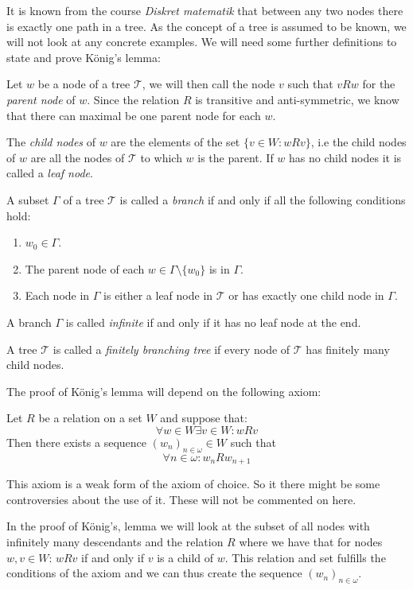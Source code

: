 \documentclass[../main.tex]{subfiles}
\begin{document}
It is known from the course \textit{Diskret matematik} that between any two
nodes there is exactly one path in a tree. 
As the concept of a tree is assumed to be known, we will not look at any concrete
examples.
We will need
some further definitions to state and prove König's lemma:
\begin{defi}
	Let $w$ be a node of a tree $\mathcal{T}$, we will then call the node
	$v$ such that $vRw$ for the \textit{parent node} of $w$. Since the
	relation $R$ is transitive and anti-symmetric, we know that there can
	maximal be one parent node for each $w$.

	The \textit{child nodes} of $w$ are the elements of the set
	$\{v\in W:wRv\}$, i.e the child nodes of $w$ are all the
	nodes of $\mathcal{T}$ to which $w$ is the parent. If $w$ has no child
	nodes it is called a \textit{leaf node}.
\end{defi}
\begin{defi}
	A subset $\Gamma$ of a tree $\mathcal{T}$ is called a
	\textit{branch} if and only if all the following conditions hold:
	\begin{enumerate}
		\item $w_0\in\Gamma$.
		\item The parent node of each $w\in\Gamma\setminus\{w_0\}$ is
			in $\Gamma$.
		\item Each node in $\Gamma$ is either a leaf node in
			$\mathcal{T}$ or has exactly one child node in
			$\Gamma$.
	\end{enumerate}
	A branch $\Gamma$ is called \textit{infinite} if and only if it has no
	leaf node at the end.
\end{defi}
\begin{defi}
	A tree $\mathcal{T}$ is called a \textit{finitely branching tree} if
	every node of $\mathcal{T}$ has finitely many child nodes.
\end{defi}

The proof of König's lemma will depend on the following axiom:
\begin{axiom}
	Let $R$ be a relation on a set $W$ and suppose that:
	\[\forall w\in W\exists v\in W: wRv\]
	Then there exists a sequence $(w_n)_{n\in\omega}\in W$ such that
	\[\forall n\in\omega: w_nRw_{n+1}\]
\end{axiom}

This axiom is a weak form of the axiom of choice. So it there might be some
controversies about the use of it. These will not be commented on here.


In the proof of König's,
lemma we will look at the subset of all nodes with infinitely many descendants
and the relation $R$ where we have that for nodes $w,v\in W$:  $wRv$ if and only if $v$ is a child of $w$. This relation and
set
fulfills the conditions of the axiom and we can thus create the sequence
$(w_n)_{n\in\omega}$.
\end{document}

